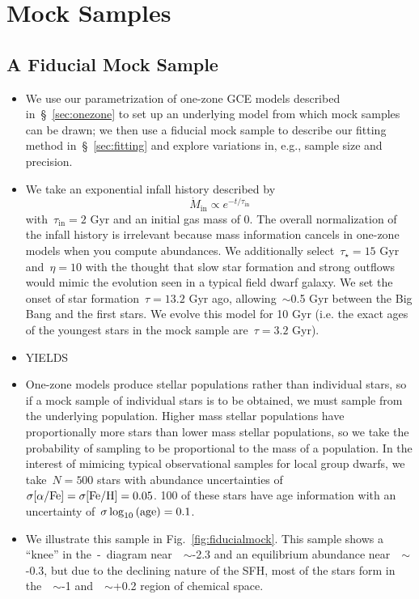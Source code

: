 \documentclass[ms.tex]{subfiles}
\begin{document}
\section{Mock Samples}
\label{sec:mocks}

\subsection{A Fiducial Mock Sample}
\label{sec:mocks:fiducial}

\begin{itemize}

	\item We use our parametrization of one-zone GCE models described
	in~\S~\ref{sec:onezone} to set up an underlying model from which
	mock samples can be drawn; we then use a fiducial mock sample to describe
	our fitting method in~\S~\ref{sec:fitting} and explore variations
	in, e.g., sample size and precision.

	\item We take an exponential infall history described by
	\begin{equation}
	\dot{M}_\text{in} \propto e^{-t/\tau_\text{in}}
	\end{equation}
	with~$\tau_\text{in} = 2$ Gyr and an initial gas mass of 0.
	The overall normalization of the infall history is irrelevant because
	mass information cancels in one-zone models when you compute abundances.
	We additionally select~$\tau_\star = 15$ Gyr and~$\eta = 10$ with the
	thought that slow star formation and strong outflows would mimic the
	evolution seen in a typical field dwarf galaxy.
	We set the onset of star formation~$\tau = 13.2$ Gyr ago, allowing~$\sim$0.5
	Gyr between the Big Bang and the first stars.
	We evolve this model for 10 Gyr (i.e. the exact ages of the youngest stars
	in the mock sample are~$\tau = 3.2$ Gyr).

	\item {\color{red} YIELDS}

	\item One-zone models produce stellar populations rather than individual
	stars, so if a mock sample of individual stars is to be obtained, we must
	sample from the underlying population.
	Higher mass stellar populations have proportionally more stars than lower
	mass stellar populations, so we take the probability of sampling to be
	proportional to the mass of a population.
	In the interest of mimicing typical observational samples for local group
	dwarfs, we take~$N = 500$ stars with abundance uncertainties of
	$\sigma\text{[$\alpha$/Fe]} = \sigma\text{[Fe/H]} = 0.05$.
	100 of these stars have age information with an uncertainty
	of~$\sigma\log_{10}\text{(age)} = 0.1$.

	\item We illustrate this sample in Fig.~\ref{fig:fiducialmock}.
	This sample shows a ``knee'' in the~\afe-\feh~diagram near~\feh~$\sim$-2.3
	and an equilibrium abundance near~\feh~$\sim$-0.3, but due to the
	declining nature of the SFH, most of the stars form in
	the~\feh~$\sim$-1 and~\afe~$\sim$+0.2 region of chemical space.

\end{itemize}
\end{document}
